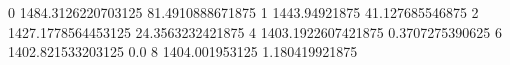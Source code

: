 0 1484.3126220703125 81.4910888671875
1 1443.94921875 41.127685546875
2 1427.1778564453125 24.3563232421875
4 1403.1922607421875 0.3707275390625
6 1402.821533203125 0.0
8 1404.001953125 1.180419921875
